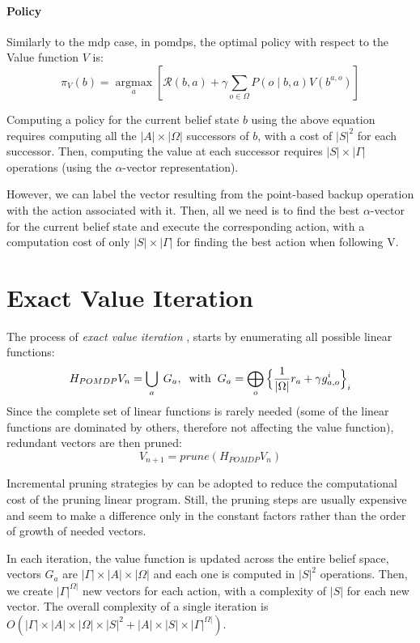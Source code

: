 \paragraph{Policy}
Similarly to the \gls{mdp} case, in \glspl{pomdp}, the optimal policy with respect to the Value function $V$ is:
$$\pi_{V}(b)=\underset{a}{\operatorname{argmax}} \left[\mathcal{R}(b, a)+\gamma \sum_{o \in \Omega} P\left(o \mid b, a\right) V\left(b^{a, o}\right)\right]$$

Computing a policy for the current belief state \(b\) using the above equation requires computing
all the \(|A| \times|\Omega|\) successors of \(b\), with a cost of \(|S|^{2}\) for each successor. 
Then, computing the value at each successor requires \(|S| \times|\Gamma|\) operations 
(using the \(\alpha\)-vector representation).

However, we can label the vector resulting from the
point-based backup operation with the action associated with it. 
Then, all we need is to find the best $\alpha$-vector for the current
belief state and execute the corresponding action, with a computation cost of only $|S|\times|\Gamma|$ for 
finding the best action when following V.

\section{Exact Value Iteration}
The process of \emph{exact value iteration} \cite{c6635fb4-4e99-3bcb-ba95-fb8ac7476062} \cite{doi:10.1287/mnsc.28.1.1},
starts by enumerating all possible linear functions:
\[
    H_{POMDP}V_{n}=\bigcup_{a}\;G_{a},\;\;\mathrm{with}\;\;G_{a}=\bigoplus_{o}\Big\{\frac{1}{%
    |\Omega|}r_{a}+\gamma g_{a,o}^{i}\Big\}_{i}  
\]
Since the complete set of linear functions is rarely needed (some of the linear functions are 
dominated by others, therefore not affecting the value function), redundant vectors are then pruned:
$$V_{n+1} = prune(H_{POMDP}V_n)$$

Incremental pruning strategies by \cite{10.5555/2074226.2074233} can be adopted to reduce the computational 
cost of the pruning linear program. Still, the pruning steps are usually expensive and seem to make a difference
only in the constant factors rather than the order of growth of needed vectors.
    
In each iteration, the value function is updated across the entire belief space, vectors $G_a$ 
are $|\Gamma| \times |A| \times |\Omega|$ and each one is computed in $|S|^2$ operations. Then, we 
create \(|\Gamma|^{\Omega|}\) new vectors for each action, with a complexity of \(|S|\) for each new 
vector. The overall complexity of a single iteration is \(O\left(|\Gamma| \times|A| \times|\Omega| \times|S|^{2}+|A| \times|S| \times|\Gamma|^{\Omega|}\right)\).

